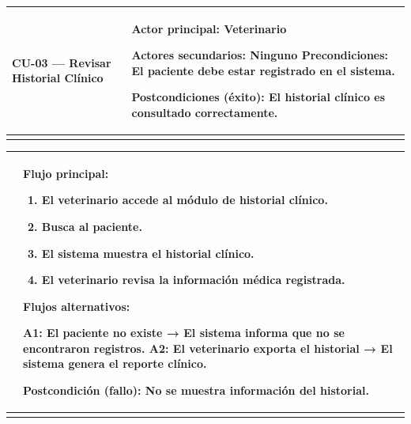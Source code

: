 \documentclass[
]{article}
\newcounter{none} %
\begin{document}
{\def\LTcaptype{none} %
\begin{longtable}[]{@{}
  >{\raggedright\arraybackslash}p{}
  >{\raggedright\arraybackslash}p{}@{}}
\toprule\noalign{}
\begin{minipage}[b]{\linewidth}\raggedright
CU-03 --- Revisar Historial Clínico
\end{minipage} & \begin{minipage}[b]{\linewidth}\raggedright
\textbf{Actor principal:} Veterinario

\textbf{Actores secundarios:} Ninguno \textbf{Precondiciones:} El
paciente debe estar registrado en el sistema.

\textbf{Postcondiciones (éxito):} El historial clínico es consultado
correctamente.
\end{minipage} \\
\midrule\noalign{}
\endhead
\bottomrule\noalign{}
\endlastfoot
\end{longtable}
}

{\def\LTcaptype{none} %
\begin{longtable}[]{@{}
  >{\raggedright\arraybackslash}p{}
  >{\raggedright\arraybackslash}p{}@{}}
\toprule\noalign{}
\begin{minipage}[b]{\linewidth}\raggedright
\end{minipage} & \begin{minipage}[b]{\linewidth}\raggedright
\textbf{Flujo principal:}

\begin{enumerate}
\def\labelenumi{\arabic{enumi}.}
\item
  El veterinario accede al módulo de historial clínico.
\item
  Busca al paciente.
\item
  El sistema muestra el historial clínico.
\item
  El veterinario revisa la información médica registrada.
\end{enumerate}

\textbf{Flujos alternativos:}

A1: El paciente no existe → El sistema informa que no se encontraron
registros. A2: El veterinario exporta el historial → El sistema genera
el reporte clínico.

\textbf{Postcondición (fallo):} No se muestra información del historial.
\end{minipage} \\
\midrule\noalign{}
\endhead
\bottomrule\noalign{}
\endlastfoot
\end{longtable}
}
\end{document}
